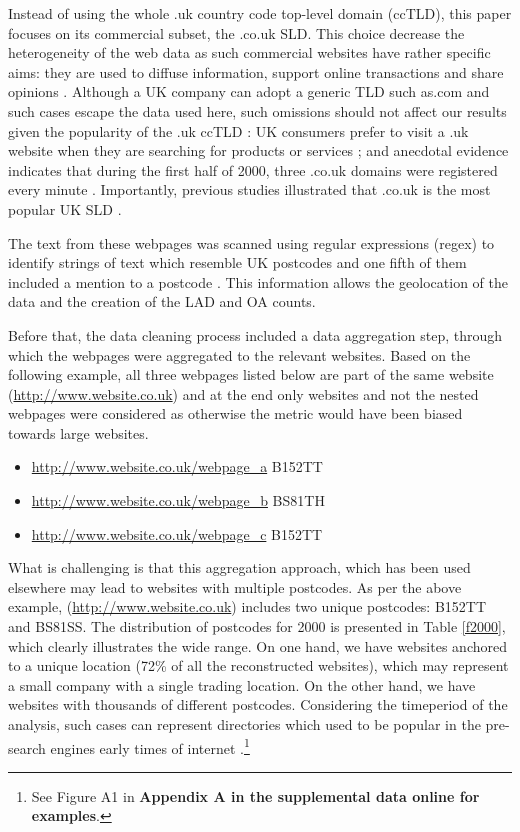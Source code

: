 \documentclass[
  authoryear,
  preprint,
  3p]{elsarticle}
\begin{document}
Instead of using the whole .uk country code top-level domain (ccTLD),
this paper focuses on its commercial subset, the .co.uk SLD. This choice
decrease the heterogeneity of the web data as such commercial websites
have rather specific aims: they are used to diffuse information, support
online transactions and share opinions
\citep{THELWALL2000441, blazquez2018big}. Although a UK company can
adopt a generic TLD such as.com and such cases escape the data used
here, such omissions should not affect our results given the popularity
of the .uk ccTLD \citep{tranosuk}: UK consumers prefer to visit a .uk
website when they are searching for products or services \citep{hope};
and anecdotal evidence indicates that during the first half of 2000,
three .co.uk domains were registered every minute \citep{oecd_coms}.
Importantly, previous studies illustrated that .co.uk is the most
popular UK SLD \citep{tranosuk}.

The text from these webpages was scanned using regular expressions
(regex) to identify strings of text which resemble UK postcodes and one
fifth of them included a mention to a postcode \citep{BL2013geo}. This
information allows the geolocation of the data and the creation of the
LAD and OA counts.

Before that, the data cleaning process included a data aggregation step,
through which the webpages were aggregated to the relevant websites.
Based on the following example, all three webpages listed below are part
of the same website (\url{http://www.website.co.uk}) and at the end only
websites and not the nested webpages were considered as otherwise the
metric would have been biased towards large websites.

\begin{itemize}
\item
  \url{http://www.website.co.uk/webpage_a} B152TT
\item
  \url{http://www.website.co.uk/webpage_b} BS81TH
\item
  \url{http://www.website.co.uk/webpage_c} B152TT
\end{itemize}

\noindent What is challenging is that this aggregation approach, which
has been used elsewhere \citep{tranosuk, shoreditch} may lead to
websites with multiple postcodes. As per the above example,
(\url{http://www.website.co.uk}) includes two unique postcodes: B152TT
and BS81SS. The distribution of postcodes for 2000 is presented in Table
\ref{f2000}, which clearly illustrates the wide range. On one hand, we
have websites anchored to a unique location (72\% of all the
reconstructed websites), which may represent a small company with a
single trading location. On the other hand, we have websites with
thousands of different postcodes. Considering the timeperiod of the
analysis, such cases can represent directories which used to be popular
in the pre-search engines early times of internet
\citep{tranosuk}.\footnote{See Figure A1 in \textbf{Appendix A in the
  supplemental data online for examples}.}
\end{document}
